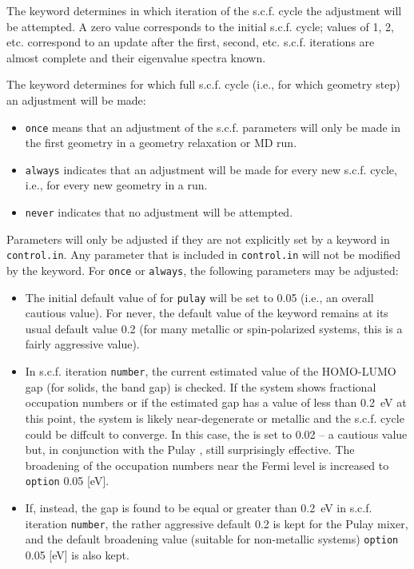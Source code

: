 The  keyword determines in which iteration of the s.c.f. cycle the
adjustment will be attempted. A zero value corresponds to the initial s.c.f. cycle;
values of 1, 2, etc. correspond to an update after the first, second, etc. s.c.f.
iterations are almost complete and their eigenvalue spectra known.

The  keyword determines for which full s.c.f. cycle
(i.e., for which geometry step) an adjustment will be made:
\begin{itemize}
\item \texttt{once} means that an adjustment of the s.c.f. parameters
  will only be made in the first geometry in a geometry relaxation or
  MD run.
\item \texttt{always}  indicates that an adjustment will be made for
  every new s.c.f. cycle, i.e., for every new geometry in a run.
\item \texttt{never} indicates that no adjustment will be attempted.
\end{itemize}

Parameters will only be adjusted if
they are not explicitly set by a keyword in \texttt{control.in}. Any
parameter that is included in \texttt{control.in} will not be modified
by the  keyword. For 
\texttt{once} or \texttt{always}, the following parameters may be adjusted:
\begin{itemize}
  \item The initial default value of  for
     \texttt{pulay} will be set to 0.05 (i.e., an overall
    cautious value). For  {never}, the default value
    of the  keyword remains at its usual
    default value 0.2 (for many metallic or spin-polarized systems,
    this is a fairly aggressive value).
  \item In s.c.f. iteration \texttt{number}, the current estimated
    value of the HOMO-LUMO gap (for solids, the band gap) is
    checked. If the system shows fractional occupation numbers or if
    the estimated gap has a value of less than 0.2~eV at this point,
    the system is likely near-degenerate or metallic and the
    s.c.f. cycle could be diffcult to converge. In this case, the
     is set to 0.02 -- a cautious value
    but, in conjunction with the Pulay , still
    surprisingly effective. The broadening of the occupation numbers
    near the Fermi level is increased to 
    \texttt{option} 0.05 [eV].
  \item If, instead, the gap is found to be equal or greater than
    0.2~eV in s.c.f. iteration \texttt{number}, the rather aggressive
    default  0.2 is kept for the Pulay
    mixer, and the default broadening value (suitable for non-metallic
    systems)  \texttt{option} 0.05 [eV] is
    also kept.
\end{itemize}

